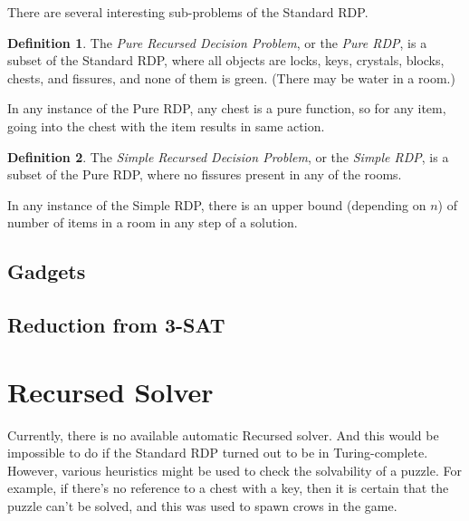 \documentclass[a4paper]{article}
\theoremstyle{definition}
\newtheorem{definition}{Definition}[section]
\begin{document}
There are several interesting sub-problems of the Standard RDP.
\begin{definition}
The \emph{Pure Recursed Decision Problem}, or the \emph{Pure RDP}, is a subset of the Standard RDP,
where all objects are locks, keys, crystals, blocks, chests, and fissures, and none of them is green. (There may be water in a room.)
\end{definition}
In any instance of the Pure RDP, any chest is a pure function, so for any item, going into the chest with the item
results in same action.

\begin{definition}
The \emph{Simple Recursed Decision Problem}, or the \emph{Simple RDP}, is a subset of the Pure RDP,
where no fissures present in any of the rooms.
\end{definition}
In any instance of the Simple RDP, there is an upper bound (depending on $n$) of number of items in a room
in any step of a solution.

\subsection{Gadgets}
\subsection{Reduction from 3-SAT}

\section{Recursed Solver}
Currently, there is no available automatic Recursed solver. And this would be impossible to do if the Standard RDP turned out to be in Turing-complete.
However, various heuristics might be used to check the solvability of a puzzle. For example, if there's no reference
to a chest with a key, then it is certain that the puzzle can't be solved, and this was used to spawn crows in the game.
\end{document}
